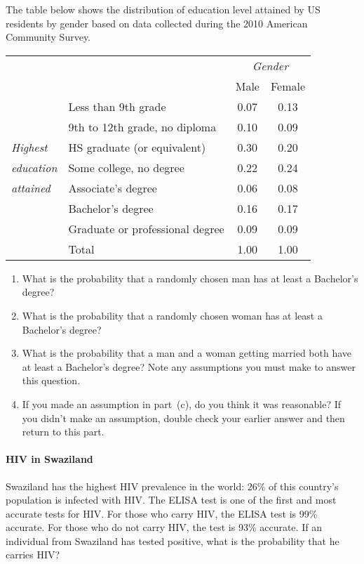 \documentclass[10pt]{article}
\begin{document}
The table below shows the distribution of education level attained by US 
residents by gender based on data collected during the 2010 American Community 
Survey.
\begin{center}
\begin{tabular}{l p{7cm} c c }
&                                       & \multicolumn{2}{c}{\textit{Gender}} \\
\cline{3-4}
&                                                   & Male  & Female \\
\cline{2-4}
& Less than 9th grade                               & 0.07  & 0.13 \\
& 9th to 12th grade, no diploma                     & 0.10  & 0.09 \\
\textit{Highest}    & HS graduate (or equivalent)   & 0.30  & 0.20 \\
\textit{education}  & Some college, no degree       & 0.22  & 0.24 \\ 
\textit{attained}   & Associate's degree            & 0.06  & 0.08 \\
& Bachelor's degree                                 & 0.16  & 0.17 \\
& Graduate or professional degree                   & 0.09  & 0.09 \\
\cline{2-4} 
& Total                                             & 1.00  & 1.00
\end{tabular}
\end{center}
\begin{enumerate}[a]
\item What is the probability that a randomly chosen man has at least a 
Bachelor's degree?
\vspace{11mm}
\item What is the probability that a randomly chosen woman has at least a 
Bachelor's degree?
\vspace{11mm}
\item What is the probability that a man and a woman getting married both have at 
least a Bachelor's degree? Note any assumptions you must make to answer this 
question.
\vspace{11mm}
\item If you made an assumption in part~(c), do you think it was reasonable? If 
you didn't make an assumption, double check your earlier answer and then return 
to this part.
\end{enumerate}

\newpage

\paragraph{HIV in Swaziland}

Swaziland has the highest HIV prevalence in the world: 26\% of this country's 
population is infected with HIV. The ELISA test is one of the first and 
most accurate tests for HIV. For those who carry HIV, the ELISA test is 99\% 
accurate. For those who do not carry HIV, the test is 93\% accurate. If an 
individual from Swaziland has tested positive, what is the probability that he 
carries HIV?
\end{document}
